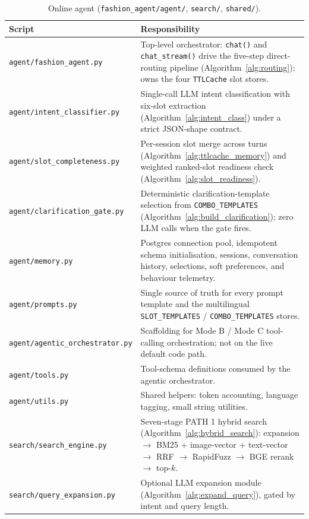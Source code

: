 \begin{table}[H]
\centering
\caption{Online agent (\texttt{fashion\_agent/agent/}, \texttt{search/}, \texttt{shared/}).}
\label{tab:impl_online_agent_scripts}
\small
\begin{tabular}{p{6.0cm} p{8.6cm}}
\toprule
\textbf{Script} & \textbf{Responsibility} \\
\midrule
\texttt{agent/fashion\_agent.py} & Top-level orchestrator: \texttt{chat()} and \texttt{chat\_stream()} drive the five-step direct-routing pipeline (Algorithm~\ref{alg:routing}); owns the four \texttt{TTLCache} slot stores. \\
\texttt{agent/intent\_classifier.py} & Single-call LLM intent classification with six-slot extraction (Algorithm~\ref{alg:intent_class}) under a strict JSON-shape contract. \\
\texttt{agent/slot\_completeness.py} & Per-session slot merge across turns (Algorithm~\ref{alg:ttlcache_memory}) and weighted ranked-slot readiness check (Algorithm~\ref{alg:slot_readiness}). \\
\texttt{agent/clarification\_gate.py} & Deterministic clarification-template selection from \texttt{COMBO\_TEMPLATES} (Algorithm~\ref{alg:build_clarification}); zero LLM calls when the gate fires. \\
\texttt{agent/memory.py} & Postgres connection pool, idempotent schema initialisation, sessions, conversation history, selections, soft preferences, and behaviour telemetry. \\
\texttt{agent/prompts.py} & Single source of truth for every prompt template and the multilingual \texttt{SLOT\_TEMPLATES} / \texttt{COMBO\_TEMPLATES} stores. \\
\texttt{agent/agentic\_orchestrator.py} & Scaffolding for Mode B / Mode C tool-calling orchestration; not on the live default code path. \\
\texttt{agent/tools.py} & Tool-schema definitions consumed by the agentic orchestrator. \\
\texttt{agent/utils.py} & Shared helpers: token accounting, language tagging, small string utilities. \\
\texttt{search/search\_engine.py} & Seven-stage PATH 1 hybrid search (Algorithm~\ref{alg:hybrid_search}): expansion $\rightarrow$ BM25 + image-vector + text-vector $\rightarrow$ RRF $\rightarrow$ RapidFuzz $\rightarrow$ BGE rerank $\rightarrow$ top-$k$. \\
\texttt{search/query\_expansion.py} & Optional LLM expansion module (Algorithm~\ref{alg:expand_query}), gated by intent and query length. \\

\end{tabular}
\end{table}
